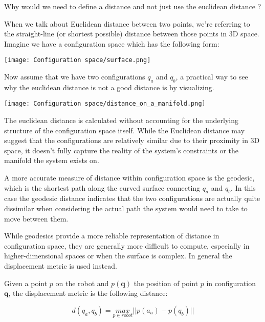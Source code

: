 \begin{warningbox}[Warning]
    Why would we need to define a distance and not just use the euclidean distance ?

    When we talk about Euclidean distance between two points, we're referring to the straight-line (or shortest possible) distance between those points in 3D space.
    Imagine we have a configuration space which has the following form:

    \begin{center}
        \texttt{[image: Configuration space/surface.png]}
    \end{center}

    Now assume that we have two configurations $q_a$ and $q_b$, a practical way to see why the euclidean distance is not a good distance is by visualizing.

    \begin{center}
        \texttt{[image: Configuration space/distance\_on\_a\_manifold.png]}
    \end{center}

    The euclidean distance is calculated without accounting for the underlying structure of the configuration space itself.
    While the Euclidean distance may suggest that the configurations are relatively similar due to their proximity in 3D space, it doesn't fully capture the reality of the system's constraints or the manifold the system exists on.

    A more accurate measure of distance within configuration space is the geodesic, which is the shortest path along the curved surface connecting $q_a$ and $q_b$. In this case the geodesic distance indicates that the two configurations are actually quite dissimilar when considering the actual path the system would need to take to move between them.



\end{warningbox}

While geodesics provide a more reliable representation of distance in configuration space, they are generally more difficult to compute, especially in higher-dimensional spaces or when the surface is complex.
In general the displacement metric is used instead.

\begin{definition}
    Given a point $p$ on the robot and $p(\bm{q})$ the position of point $p$ in configuration $\bm{q}$, the displacement metric is the following distance:

    $$
        d(q_a,q_b) = \underset{p \in robot}{max} ||p(a_a) - p(q_b)||
    $$
\end{definition}

